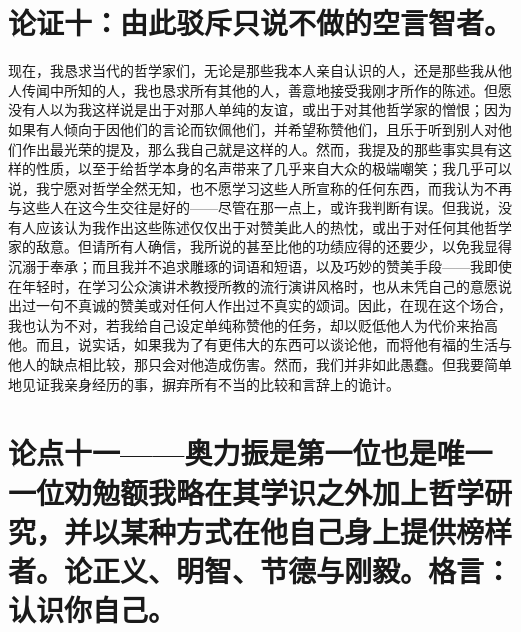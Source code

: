 
\section{论证十：由此驳斥只说不做的空言智者。}

现在，我恳求当代的哲学家们，无论是那些我本人亲自认识的人，还是那些我从他人传闻中所知的人，我也恳求所有其他的人，善意地接受我刚才所作的陈述。但愿没有人以为我这样说是出于对那人单纯的友谊，或出于对其他哲学家的憎恨；因为如果有人倾向于因他们的言论而钦佩他们，并希望称赞他们，且乐于听到别人对他们作出最光荣的提及，那么我自己就是这样的人。然而，我提及的那些事实具有这样的性质，以至于给哲学本身的名声带来了几乎来自大众的极端嘲笑；我几乎可以说，我宁愿对哲学全然无知，也不愿学习这些人所宣称的任何东西，而我认为不再与这些人在这今生交往是好的——尽管在那一点上，或许我判断有误。但我说，没有人应该认为我作出这些陈述仅仅出于对赞美此人的热忱，或出于对任何其他哲学家的敌意。但请所有人确信，我所说的甚至比他的功绩应得的还要少，以免我显得沉溺于奉承；而且我并不追求雕琢的词语和短语，以及巧妙的赞美手段——我即使在年轻时，在学习公众演讲术教授所教的流行演讲风格时，也从未凭自己的意愿说出过一句不真诚的赞美或对任何人作出过不真实的颂词。因此，在现在这个场合，我也认为不对，若我给自己设定单纯称赞他的任务，却以贬低他人为代价来抬高他。而且，说实话，如果我为了有更伟大的东西可以谈论他，而将他有福的生活与他人的缺点相比较，那只会对他造成伤害。然而，我们并非如此愚蠢。但我要简单地见证我亲身经历的事，摒弃所有不当的比较和言辞上的诡计。\par


\section{论点十一——奥力振是第一位也是唯一一位劝勉额我略在其学识之外加上哲学研究，并以某种方式在他自己身上提供榜样者。论正义、明智、节德与刚毅。格言：认识你自己。}

